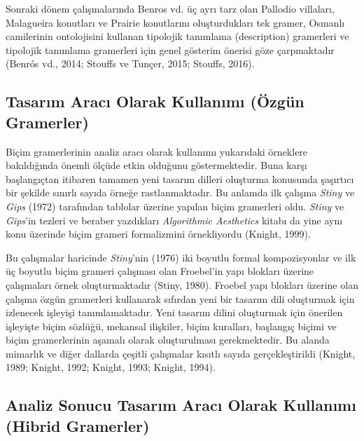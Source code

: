 \documentclass[12pt,turkish,a4paperpaper,]{report}
\begin{document}
Sonraki dönem çalışmalarında Benros vd. üç ayrı tarz olan Pallodio
villaları, Malagueira konutları ve Prairie konutlarını oluşturdukları
tek gramer, Osmanlı camilerinin ontolojisini kullanan tipolojik
tanımlama (description) gramerleri ve tipolojik tanımlama gramerleri
için genel gösterim önerisi göze çarpmaktadır (Benrós vd., 2014; Stouffs
ve Tunçer, 2015; Stouffs, 2016).

\hypertarget{tasarux131m-aracux131-olarak-kullanux131mux131-uxf6zguxfcn-gramerler}{%
\subsection{Tasarım Aracı Olarak Kullanımı (Özgün
Gramerler)}\label{tasarux131m-aracux131-olarak-kullanux131mux131-uxf6zguxfcn-gramerler}}

Biçim gramerlerinin analiz aracı olarak kullanımı yukarıdaki örneklere
bakıldığında önemli ölçüde etkin olduğunu göstermektedir. Buna karşı
başlangıçtan itibaren tamamen yeni tasarım dilleri oluşturma konusunda
şaşırtıcı bir şekilde sınırlı sayıda örneğe rastlanmaktadır. Bu anlamda
ilk çalışma \emph{Stiny} ve \emph{Gips} (1972) tarafından tablolar
üzerine yapılan biçim gramerleri oldu. \emph{Stiny} ve \emph{Gips}'in
tezleri ve beraber yazdıkları \emph{Algorithmic Aesthetics} kitabı da
yine aynı konu üzerinde biçim grameri formalizmini örnekliyordu (Knight,
1999).

Bu çalışmalar haricinde \emph{Stiny}'nin (1976) iki boyutlu formal
kompozisyonlar ve ilk üç boyutlu biçim grameri çalışması olan Froebel'in
yapı blokları üzerine çalışmaları örnek oluşturmaktadır (Stiny, 1980).
Froebel yapı blokları üzerine olan çalışma özgün gramerleri kullanarak
sıfırdan yeni bir tasarım dili oluşturmak için izlenecek işleyişi
tanımlamaktadır. Yeni tasarım dilini oluşturmak için önerilen işleyişte
biçim sözlüğü, mekansal ilişkiler, biçim kuralları, başlangıç biçimi ve
biçim gramerlerinin aşamalı olarak oluşturulması gerekmektedir. Bu
alanda mimarlık ve diğer dallarda çeşitli çalışmalar kısıtlı sayıda
gerçekleştirildi (Knight, 1989; Knight, 1992; Knight, 1993; Knight,
1994).

\hypertarget{analiz-sonucu-tasarux131m-aracux131-olarak-kullanux131mux131-hibrid-gramerler}{%
\subsection{Analiz Sonucu Tasarım Aracı Olarak Kullanımı (Hibrid
Gramerler)}\label{analiz-sonucu-tasarux131m-aracux131-olarak-kullanux131mux131-hibrid-gramerler}}
\end{document}
